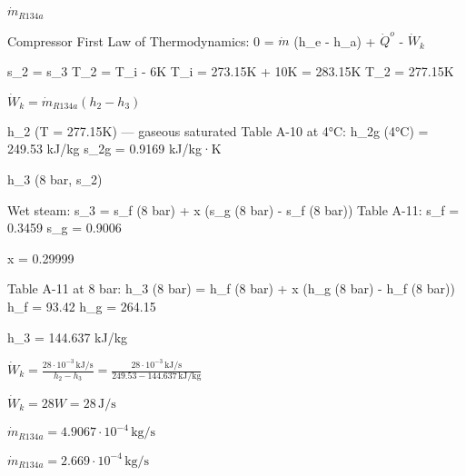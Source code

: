 \( \dot{m}_{R134a} \)  

Compressor  
First Law of Thermodynamics:  
0 = \( \dot{m} \) (h_e - h_a) + \( \dot{Q}^o \) - \( \dot{W}_k \)  

s_2 = s_3  
T_2 = T_i - 6K  
T_i = 273.15K + 10K = 283.15K  
T_2 = 277.15K  

\( \dot{W}_k = \dot{m}_{R134a} (h_2 - h_3) \)  

h_2 (T = 277.15K) — gaseous saturated  
Table A-10 at 4°C:  
h_2g (4°C) = 249.53 kJ/kg  
s_2g = 0.9169 kJ/kg·K  

h_3 (8 bar, s_2)  

Wet steam:  
s_3 = s_f (8 bar) + x (s_g (8 bar) - s_f (8 bar))  
Table A-11:  
s_f = 0.3459  
s_g = 0.9006  

x = 0.29999  

Table A-11 at 8 bar:  
h_3 (8 bar) = h_f (8 bar) + x (h_g (8 bar) - h_f (8 bar))  
h_f = 93.42  
h_g = 264.15  

h_3 = 144.637 kJ/kg  

\( \dot{W}_k = \frac{28 \cdot 10^{-3} \, \text{kJ/s}}{h_2 - h_3} = \frac{28 \cdot 10^{-3} \, \text{kJ/s}}{249.53 - 144.637 \, \text{kJ/kg}} \)  

\( \dot{W}_k = 28W = 28 \, \text{J/s} \)  

\( \dot{m}_{R134a} = 4.9067 \cdot 10^{-4} \, \text{kg/s} \)  

\( \dot{m}_{R134a} = 2.669 \cdot 10^{-4} \, \text{kg/s} \)